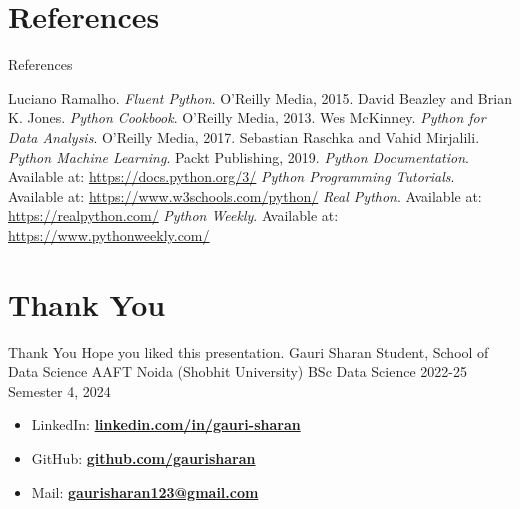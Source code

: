 \documentclass[aspectratio=169, hideothersubsections]{beamer}
\begin{document}
\section{References}
\begin{frame}{References}
  \begin{thebibliography}{10}
    \beamertemplatebookbibitems
     Luciano Ramalho. \textit{Fluent Python}. O'Reilly Media, 2015.
    \beamertemplatebookbibitems
     David Beazley and Brian K. Jones. \textit{Python Cookbook}. O'Reilly Media, 2013.
    \beamertemplatebookbibitems
     Wes McKinney. \textit{Python for Data Analysis}. O'Reilly Media, 2017.
    \beamertemplatebookbibitems
     Sebastian Raschka and Vahid Mirjalili. \textit{Python Machine Learning}. Packt Publishing, 2019.
    \beamertemplatebookbibitems
     \textit{Python Documentation}. Available at: \url{https://docs.python.org/3/}
    \beamertemplatebookbibitems
     \textit{Python Programming Tutorials}. Available at: \url{https://www.w3schools.com/python/}
    \beamertemplatebookbibitems
     \textit{Real Python}. Available at: \url{https://realpython.com/}
    \beamertemplatebookbibitems
     \textit{Python Weekly}. Available at: \url{https://www.pythonweekly.com/}
  \end{thebibliography}
\end{frame}

\section{Thank You}
\begin{frame}{Thank You}
Hope you liked this presentation. \newline \newline
\alert{Gauri Sharan} \newline
Student, School of Data Science \newline
AAFT Noida (Shobhit University) \newline
BSc Data Science 2022-25 \newline
Semester 4, 2024 \newline
\begin{itemize}
    \item LinkedIn: \href{https://www.linkedin.com/in/gauri-sharan}{\bf linkedin.com/in/gauri-sharan} 
    \item GitHub: \href{https://github.com/gaurisharan}{\bf github.com/gaurisharan}
    \item Mail: \href{mailto:gaurisharan123@gmail.com}{\bf gaurisharan123@gmail.com}
\end{itemize}
\end{frame}
\end{document}
